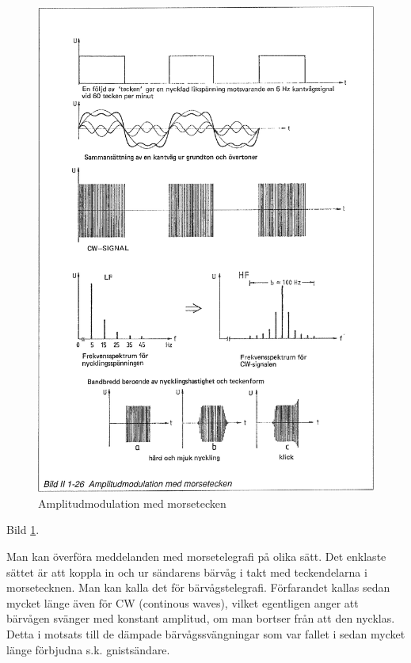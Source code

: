 \begin{figure}[ht]
\begin{center}
\includegraphics[width=14cm]{images/bild_2_1-26}
\caption{Amplitudmodulation med morsetecken}
\label{fig:BildII1-26}
\end{center}
\end{figure}

Bild \ref{fig:BildII1-26}.

Man kan överföra meddelanden med morsetelegrafi på olika sätt. Det enklaste
sättet är att koppla in och ur sändarens bärvåg i takt med teckendelarna i
morsetecknen. Man kan kalla det för bärvågstelegrafi. Förfarandet kallas sedan
mycket länge även för CW (continous waves), vilket egentligen anger att
bärvågen svänger med konstant amplitud, om man bortser från att den nycklas.
Detta i motsats till de dämpade bärvågssvängningar som var fallet i sedan
mycket länge förbjudna s.k. gnistsändare.

